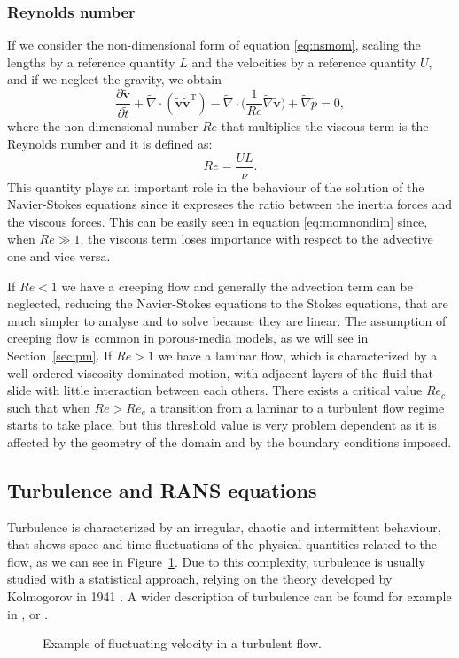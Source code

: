 \subsubsection{Reynolds number}
If we consider the non-dimensional form of equation \eqref{eq:nsmom}, scaling 
the lengths by a reference quantity $L$ and the velocities by a reference 
quantity $U$, and if we neglect the gravity, we obtain
\begin{equation} \label{eq:momnondim}
	\frac{\partial{\tilde{\mathbf{v}}}}{\partial \tilde{t}} + \tilde{\nabla} 
	\cdot (\tilde{\mathbf{v}} \tilde{\mathbf{v}}^\mathrm{T}) - \tilde{\nabla} 
	\cdot \bigg(\frac{1}{Re} \tilde{\nabla} \tilde{\mathbf{v}}\bigg) + 
	\tilde{\nabla} 
	\tilde{p} = 0,
\end{equation}
where the non-dimensional number $Re$ that multiplies the viscous term is the 
Reynolds number and it is defined as:
\begin{equation}
Re = \frac{UL}{\nu}.
\end{equation}
This quantity plays an important role in the behaviour of the solution of the 
Navier-Stokes equations since it expresses the ratio between the inertia forces 
and the viscous forces. This can be easily seen in equation 
\eqref{eq:momnondim} since, when $Re\gg 1$, the viscous term loses 
importance with respect to the advective one and vice versa.

If $Re < 1$ we have a creeping flow and generally the advection term can 
be neglected, reducing the Navier-Stokes equations to the Stokes equations, 
that are much simpler to analyse and to solve because they are linear. The 
assumption of creeping flow is common in porous-media models, as we will 
see in Section~\ref{sec:pm}. If $Re>1$ we have a laminar flow, which is 
characterized by a well-ordered viscosity-dominated motion, with adjacent 
layers of the fluid that slide with little interaction between each others.
There exists a critical value $Re_c$ such that when $Re>Re_c$ a 
transition from a laminar to a turbulent flow regime starts to take place, but 
this threshold value is very problem dependent as it is affected by the 
geometry of the domain and by the boundary conditions imposed.
%
\subsection{Turbulence and RANS equations}
Turbulence is characterized by an irregular, chaotic and intermittent 
behaviour, that shows space and time fluctuations of the physical quantities 
related to the flow, as we can see in Figure~\ref{fig:fluctuations}. Due to 
this complexity, turbulence is usually studied with 
a statistical approach, relying on the theory developed by Kolmogorov 
in 1941 \cite{turbo:kolmogorov}. A wider description of turbulence can be 
found for example in \cite{main:pope}, \cite{main:wilcox} or 
\cite{main:davidson}.
\begin{figure}[ht]
	\centering
	
	\caption[Fluctuating velocity in a turbulent flow]{Example of fluctuating 
	velocity in a turbulent flow.} %
	\label{fig:fluctuations}
\end{figure}

